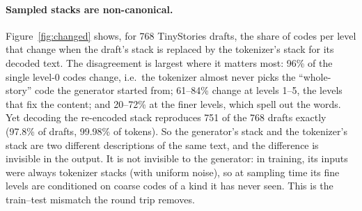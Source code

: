 \documentclass[10pt]{article}
\begin{document}
\paragraph{Sampled stacks are non-canonical.} Figure~\ref{fig:changed} shows, for 768 TinyStories drafts, the share of codes per level that change when the draft's stack is replaced by the tokenizer's stack for its decoded text. The disagreement is largest where it matters most: 96\% of the single level-0 codes change, i.e.\ the tokenizer almost never picks the ``whole-story'' code the generator started from; 61--84\% change at levels 1--5, the levels that fix the content; and 20--72\% at the finer levels, which spell out the words. Yet decoding the re-encoded stack reproduces 751 of the 768 drafts exactly (97.8\% of drafts, 99.98\% of tokens). So the generator's stack and the tokenizer's stack are two different descriptions of the same text, and the difference is invisible in the output. It is not invisible to the generator: in training, its inputs were always tokenizer stacks (with uniform noise), so at sampling time its fine levels are conditioned on coarse codes of a kind it has never seen. This is the train--test mismatch the round trip removes.
\end{document}
